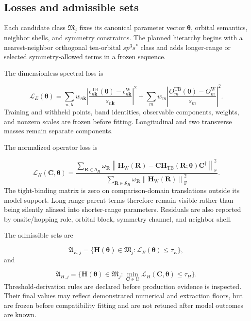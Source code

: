 \documentclass[11pt]{article}
\newenvironment{prospective}{\color{prospectivered}}{}
\begin{document}
\begin{prospective}
\subsection{Losses and admissible sets}
Each candidate class $\mathfrak M_j$ fixes its canonical parameter vector $\boldsymbol\theta$, orbital semantics, neighbor shells, and symmetry constraints. The planned hierarchy begins with a nearest-neighbor orthogonal ten-orbital $sp^3s^\ast$ class and adds longer-range or selected symmetry-allowed terms in a frozen sequence.

The dimensionless spectral loss is

\begin{equation*}
\mathcal L_E(\boldsymbol\theta)
=
\sum_{n,\mathbf k}w_{n\mathbf k}
\left|
\frac{\epsilon_{n\mathbf k}^{\mathrm{TB}}(\boldsymbol\theta)
-\epsilon_{n\mathbf k}^{\mathrm W}}{s_{n\mathbf k}}
\right|^2
+
\sum_m w_m
\left|
\frac{O_m^{\mathrm{TB}}(\boldsymbol\theta)-O_m^{\mathrm W}}{s_m}
\right|^2.
\tag{5}
\end{equation*}
Training and withheld points, band identities, observable components, weights, and nonzero scales are frozen before fitting. Longitudinal and two transverse masses remain separate components.

The normalized operator loss is

\begin{equation*}
\mathcal L_H(\mathbf C,\boldsymbol\theta)
=
\frac{
\displaystyle\sum_{\mathbf R\in\mathcal S_H}\omega_{\mathbf R}
\left\|\mathbf H_{\mathrm W}(\mathbf R)
-\mathbf C\mathbf H_{\mathrm{TB}}(\mathbf R;\boldsymbol\theta)
\mathbf C^\dagger\right\|_{\mathrm F}^{2}
}{
\displaystyle\sum_{\mathbf R\in\mathcal S_H}\omega_{\mathbf R}
\left\|\mathbf H_{\mathrm W}(\mathbf R)\right\|_{\mathrm F}^{2}
}.
\tag{6}
\end{equation*}
The tight-binding matrix is zero on comparison-domain translations outside its model support. Long-range parent terms therefore remain visible rather than being silently aliased into shorter-range parameters. Residuals are also reported by onsite/hopping role, orbital block, symmetry channel, and neighbor shell.

The admissible sets are

\begin{equation*}
\mathfrak A_{E,j}
=
\{\mathbf H(\boldsymbol\theta)\in\mathfrak M_j:
\mathcal L_E(\boldsymbol\theta)\leq\tau_E\},
\tag{7}
\end{equation*}
and

\begin{equation*}
\mathfrak A_{H,j}
=
\{\mathbf H(\boldsymbol\theta)\in\mathfrak M_j:
\min_{\mathbf C\in\mathcal U}\mathcal L_H(\mathbf C,\boldsymbol\theta)
\leq\tau_H\}.
\tag{8}
\end{equation*}
Threshold-derivation rules are declared before production evidence is inspected. Their final values may reflect demonstrated numerical and extraction floors, but are frozen before compatibility fitting and are not retuned after model outcomes are known.


\end{prospective}
\end{document}
